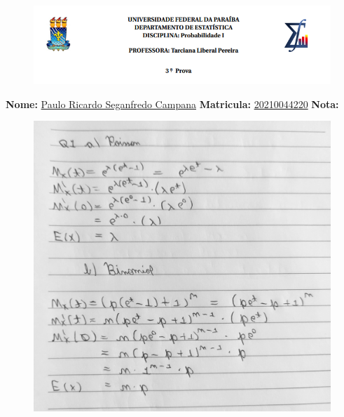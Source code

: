 \documentclass[12pt]{article}
\begin{document}
	
	\begin{figure}[h!]
		\includegraphics[scale=1]{ufpbde}
	\end{figure}
\par \textbf{Nome:} \underline{Paulo Ricardo Seganfredo Campana} \hspace{+12pt} \textbf{Matricula:} \underline{20210044220} \hspace{+12pt} \textbf{Nota:} 

	\begin{figure}[h!]
		\includegraphics[scale=0.2]{q1}
	\end{figure}
\end{document}
